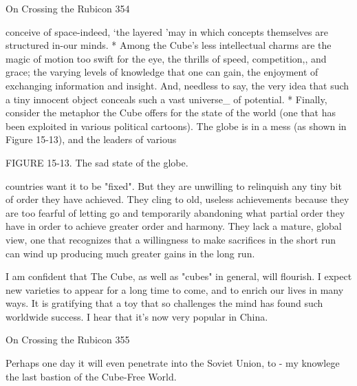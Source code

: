 On Crossing the Rubicon                                                              354

conceive of space-indeed, `the layered 'may in which concepts themselves are
structured in-our minds.
        * Among the Cube's less intellectual charms are the magic of motion too
swift for the eye, the thrills of speed, competition,, and grace; the varying levels of
knowledge that one can gain, the enjoyment of exchanging information and
insight. And, needless to say, the very idea that such a tiny innocent object
conceals such a vast universe\_ of potential.
        * Finally, consider the metaphor the Cube offers for the state of the world
(one that has been exploited in various political cartoons). The globe is in a mess
(as shown in Figure 15-13), and the leaders of various




FIGURE 15-13. The sad state of the globe.

countries want it to be "fixed". But they are unwilling to relinquish any tiny bit of
order they have achieved. They cling to old, useless achievements because they are
too fearful of letting go and temporarily abandoning what partial order they have in
order to achieve greater order and harmony. They lack a mature, global view, one
that recognizes that a willingness to make sacrifices in the short run can wind up
producing much greater gains in the long run.

       I am confident that The Cube, as well as "cubes" in general, will flourish. I
expect new varieties to appear for a long time to come, and to enrich our lives in
many ways. It is gratifying that a toy that so challenges the mind has found such
worldwide success. I hear that it's now very popular in China.




On Crossing the Rubicon                                                               355

Perhaps one day it will even penetrate into the Soviet Union, to - my knowlege the
last bastion of the Cube-Free World.

